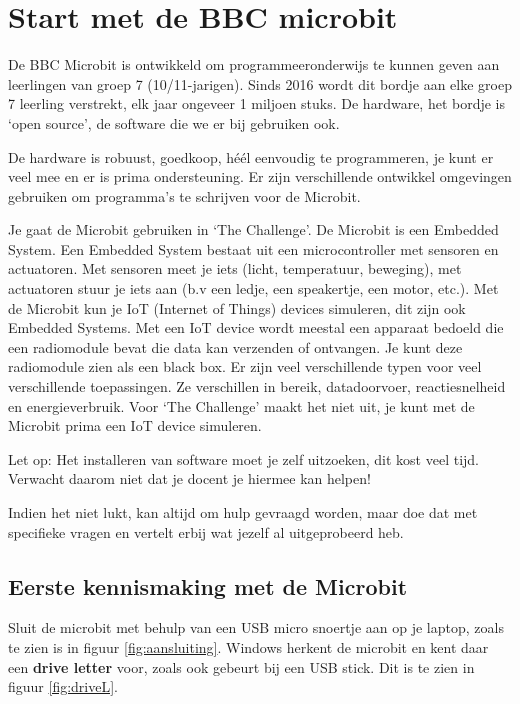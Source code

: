 
\section{Start met de BBC microbit}

De BBC Microbit is ontwikkeld om programmeeronderwijs te kunnen geven aan leerlingen van groep 7 (10/11-jarigen). Sinds 2016 wordt dit bordje aan elke groep 7 leerling verstrekt, elk jaar ongeveer 1 miljoen stuks. De hardware, het bordje is ‘open source’, de software die we er bij gebruiken ook.

De hardware is robuust, goedkoop, héél eenvoudig te programmeren, je kunt er veel mee en er is prima ondersteuning. Er zijn verschillende ontwikkel omgevingen gebruiken om programma’s te schrijven voor de Microbit. 

Je gaat de Microbit gebruiken in ‘The Challenge’. De Microbit is een Embedded System. Een Embedded System bestaat uit een microcontroller met sensoren en actuatoren. Met sensoren meet je iets (licht, temperatuur, beweging), met actuatoren stuur je iets aan (b.v een ledje, een speakertje, een motor, etc.). Met de Microbit kun je IoT (Internet of Things) devices simuleren, dit zijn ook Embedded Systems. Met een IoT device wordt meestal een apparaat bedoeld die een radiomodule bevat die data kan verzenden of ontvangen. Je kunt deze radiomodule zien als een black box. Er zijn veel verschillende typen voor veel verschillende toepassingen. Ze verschillen in bereik, datadoorvoer, reactiesnelheid en energieverbruik. 
Voor ‘The Challenge’ maakt het niet uit, je kunt met de Microbit prima een IoT device simuleren.

Let op: Het installeren van software moet je zelf uitzoeken, dit kost veel tijd. Verwacht daarom niet dat je docent je hiermee kan helpen!

Indien het niet lukt, kan altijd om hulp gevraagd worden, maar doe dat met specifieke vragen en vertelt erbij wat jezelf al uitgeprobeerd heb.

\subsection{Eerste kennismaking met de Microbit}

Sluit de microbit met behulp van een USB micro snoertje aan op je laptop, zoals te zien is in figuur \ref{fig:aansluiting}.
Windows herkent de microbit en kent daar een \textbf{drive letter} voor, zoals ook gebeurt bij een USB stick. Dit is te zien in figuur \ref{fig:driveL}.


